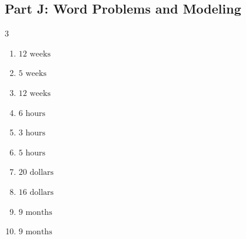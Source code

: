 \documentclass[11pt]{article}
\begin{document}
\subsection*{Part J: Word Problems and Modeling}
\begin{multicols}{3}
\begin{enumerate}
  \item $12\text{ weeks}$
  \item $5\text{ weeks}$
  \item $12\text{ weeks}$
  \item $6\text{ hours}$
  \item $3\text{ hours}$
  \item $5\text{ hours}$
  \item $20\text{ dollars}$
  \item $16\text{ dollars}$
  \item $9\text{ months}$
  \item $9\text{ months}$
\end{enumerate}
\end{multicols}
\end{document}

